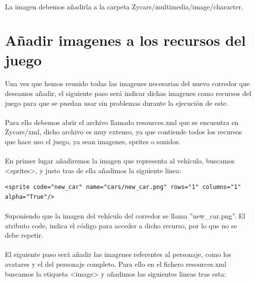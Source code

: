 \paragraph{}
La imagen debemos añadirla a la carpeta Zycars/multimedia/image/character.

\section{Añadir imagenes a los recursos del juego}

\paragraph{}
Una vez que hemos reunido todas las imagenes necesarias del nuevo corredor que deseamos añadir, el siguiente paso será indicar
dichas imagenes como recursos del juego para que se puedan usar sin problemas durante la ejecución de este.

\paragraph{}
Para ello debemos abrir el archivo llamado resources.xml que se encuentra en Zycars/xml, dicho archivo es muy extenso, ya que 
contiende todos los recursos que hace uso el juego, ya sean imagenes, sprites o sonidos.

\paragraph{}
En primer lugar añadiremos la imagen que representa al vehículo, buscamos <sprites>, y justo tras de ella añadimos la siguiente 
linea:

\begin{lstlisting}[style=XML]
<sprite code="new_car" name="cars/new_car.png" rows="1" columns="1" alpha="True"/>
\end{lstlisting}

\paragraph{}
Suponiendo que la imagen del vehículo del corredor se llama ''new\_car.png''. El atributo code, indica el código para acceder a 
dicho recurso, por lo que no se debe repetir.

\paragraph{}
El siguiente paso será añadir las imagenes referentes al personaje, como los avatares y el del personaje completo. Para ello en el 
fichero resources.xml buscamos la etiqueta <image> y añadimos las siguientes lineas tras esta:

